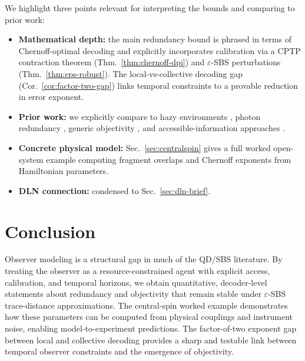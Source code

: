 \documentclass[11pt]{article}
\newcommand{\1}{\mathbf{1}}
\theoremstyle{definition}
\theoremstyle{plain}
\begin{document}
We highlight three points relevant for interpreting the bounds and comparing to prior work:

\begin{itemize}[leftmargin=2em]
\item \textbf{Mathematical depth:} the main redundancy bound is phrased in terms of Chernoff-optimal decoding \citep{Audenaert2007,NussbaumSzkola2009} and explicitly incorporates calibration via a CPTP contraction theorem (Thm.~\ref{thm:chernoff-dpi}) and $\varepsilon$-SBS perturbations (Thm.~\ref{thm:eps-robust}).
The local-vs-collective decoding gap (Cor.~\ref{cor:factor-two-gap}) links temporal constraints to a provable reduction in error exponent.
\item \textbf{Prior work:} we explicitly compare to hazy environments \citep{ZwolakQuanZurek2009}, photon redundancy \citep{RiedelZurek2010,RiedelZurek2011}, generic objectivity \citep{BrandaoPianiHorodecki2015,Knott2018}, and accessible-information approaches \citep{Touil2022}.
\item \textbf{Concrete physical model:} Sec.~\ref{sec:centralspin} gives a full worked open-system example computing fragment overlaps and Chernoff exponents from Hamiltonian parameters.
\item \textbf{DLN connection:} condensed to Sec.~\ref{sec:dln-brief}.
\end{itemize}

\section{Conclusion}

Observer modeling is a structural gap in much of the QD/SBS literature.
By treating the observer as a resource-constrained agent with explicit access, calibration, and temporal horizons, we obtain quantitative, decoder-level statements about redundancy and objectivity that remain stable under $\varepsilon$-SBS trace-distance approximations.
The central-spin worked example demonstrates how these parameters can be computed from physical couplings and instrument noise, enabling model-to-experiment predictions.
The factor-of-two exponent gap between local and collective decoding provides a sharp and testable link between temporal observer constraints and the emergence of objectivity.



\end{document}

